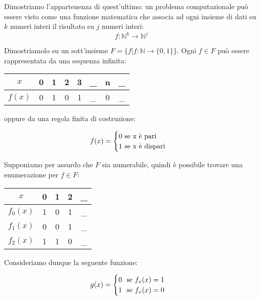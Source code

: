 Dimostriamo l'appartenenza di quest'ultimo: un problema computazionale può essere visto come una funzione matematica che associa ad ogni insieme di dati su $k$ numeri interi il risultato su $j$ numeri interi:
$$ f :  \mathbb{N}^{k} \longrightarrow \mathbb{N}^{j} $$

Dimostriamolo su un sott'insieme $F = \{f | f: \mathbb{N} \longrightarrow \{0, 1\}\}$. Ogni $f \in F$ può essere rappresentata da una sequenza infinita:
\begin{table}[!h]
    \centering
    \begin{tabular}{c|c|c|c|c|c|c|c}
         $x$ & 0 & 1 & 2 & 3 & \_ & n & \_  \\
         \hline
         $f(x)$ & 0 & 1 & 0 & 1 & \_ & 0 & \_
    \end{tabular}
\end{table}

oppure da una regola finita di costruzione:

\begin{equation}
    f(x) =
    \begin{cases}
        $0 \text{se x è pari}$ \\
        $1 \text{se x è dispari}$
    \end{cases}
\end{equation}

Supponiamo per assurdo che $F$ sia numerabile, quindi è possibile trovare una enumerazione per $f \in F$:
\begin{table}[!h]
    \centering
    \begin{tabular}{c|c c c c}
        $x$ & 0 & 1 & 2 & \_  \\
        \hline
        $f_0(x)$ & 1 & 0 & 1 & \_ \\ 
        $f_1(x)$ & 0 & 0 & 1 & \_ \\ 
        $f_2(x)$ & 1 & 1 & 0 & \_ \\ 
    \end{tabular}
\end{table}

Consideriamo dunque la seguente funzione:

\begin{equation}
    g(x) = 
    \begin{cases}
        $0 \text{ se }$ f_x(x) = 1 \\
        $1 \text{ se }$ f_x(x) = 0 \\
    \end{cases}
\end{equation}

